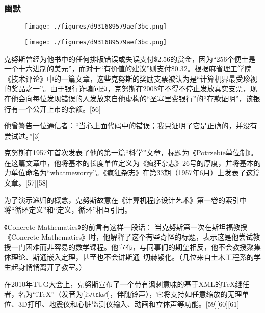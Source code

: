 \subsubsection{幽默}
\begin{figure}[ht]
\centering
\texttt{[image: ./figures/d931689579aef3bc.png]}
\caption{} \label{fig_GDN_2}
\end{figure}\begin{figure}[ht]
\centering
\texttt{[image: ./figures/d931689579aef3bc.png]}
\caption{} \label{fig_GDN_3}
\end{figure}
克努斯曾经为他书中的任何排版错误或失误支付\$2.56的赏金，因为“256个便士是一个十六进制的美元”，而对于“有价值的建议”则支付\$0.32。根据麻省理工学院《技术评论》中的一篇文章，这些克努斯的奖励支票被认为是“计算机界最受珍视的奖品之一”。由于银行诈骗问题，克努斯在2008年不得不停止发放真实支票，现在他会向每位发现错误的人发放来自他虚构的“圣塞里费银行”的“存款证明”，该银行有一个公开上市的余额。[56]

他曾警告一位通信者：“当心上面代码中的错误；我只证明了它是正确的，并没有尝试过。”[3]

克努斯在1957年首次发表了他的第一篇“科学”文章，标题为《Potrzebie单位制》。在这篇文章中，他将基本的长度单位定义为《疯狂杂志》26号的厚度，并将基本的力单位命名为“whatmeworry”。《疯狂杂志》在第33期（1957年6月）上发表了这篇文章。[57][58]

为了演示递归的概念，克努斯故意在《计算机程序设计艺术》第一卷的索引中将“循环定义”和“定义，循环”相互引用。

《Concrete Mathematics》的前言有这样一段话：
当克努斯第一次在斯坦福教授《Concrete Mathematics》时，他解释了这个有些奇怪的标题，表示这是他尝试教授一门困难而非容易的数学课程。他宣布，与同事们的期望相反，他不会教授聚集体理论、斯通嵌入定理，甚至也不会讲斯通–切赫紧化。（几位来自土木工程系的学生起身悄悄离开了教室。）

在2010年TUG大会上，克努斯宣布了一个带有讽刺意味的基于XML的TeX继任者，名为“iTeX”（发音为[iː˨˩˦tɛks˧˥]，伴随铃声），它将支持如任意缩放的无理单位、3D打印、地震仪和心脏监测仪输入、动画和立体声等功能。[59][60][61]